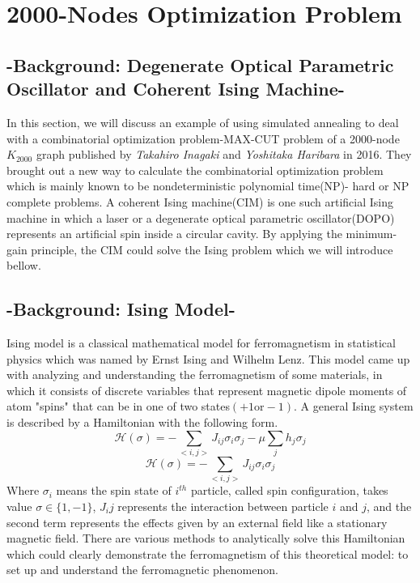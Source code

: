 \documentclass{turabian-researchpaper}
\begin{document}
\section{2000-Nodes Optimization Problem}

    \subsection{-Background: Degenerate Optical Parametric Oscillator and Coherent Ising Machine-}
        In this section, we will discuss an example of using simulated annealing to deal with a combinatorial optimization problem-MAX-CUT problem of a 2000-node $K_{2000}$ graph published by \textit{Takahiro Inagaki} and \textit{Yoshitaka Haribara} in 2016. They brought out a new way to calculate the combinatorial optimization problem which is mainly known to be nondeterministic polynomial time(NP)- hard or NP complete problems. A coherent Ising machine(CIM) is one such artificial Ising machine in which a laser or a degenerate optical parametric oscillator(DOPO) represents an artificial spin inside a circular cavity. By applying the minimum-gain principle, the CIM could solve the Ising problem which we will introduce bellow.
    \subsection{-Background: Ising Model-}
        Ising model is a classical mathematical model for ferromagnetism in statistical physics which was named by Ernst Ising and Wilhelm Lenz. This model came up with analyzing and understanding the ferromagnetism of some materials, in which it consists of discrete variables that represent magnetic dipole moments of atom "spins" that can be in one of two states$(+1 \text{or} -1)$. A general Ising system is described by a Hamiltonian with the following form.
            \begin{equation}
                \mathcal{H} (\sigma) = -\sum_{<i,j>} J_{ij}\sigma_i\sigma_j - \mu\sum_j h_j\sigma_j 
            \end{equation}
            \begin{equation}
                \mathcal{H} (\sigma) = -\sum_{<i,j>} J_{ij}\sigma_i\sigma_j
            \end{equation}
        Where $\sigma_i$ means the spin state of $i^{th}$ particle, called spin configuration, takes value $\sigma \in \{1,-1\}$, $J_ij $ represents the interaction between particle $i$ and $j$, and the second term represents the effects given by an external field like a stationary magnetic field. There are various methods to analytically solve this Hamiltonian which could clearly demonstrate the ferromagnetism of this theoretical model: to set up and understand the ferromagnetic phenomenon.
        
\end{document}
